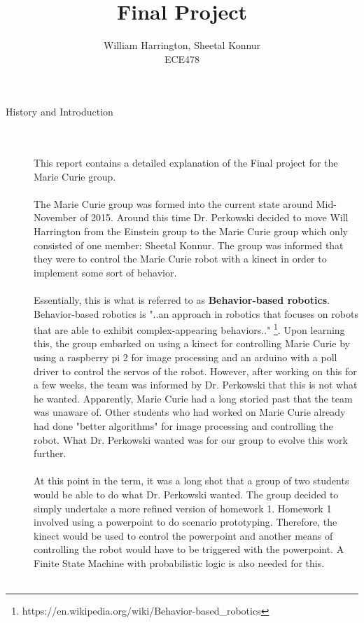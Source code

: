 \documentclass[12pt]{article}
\begin{document}
\title{Final Project}%
\author{William Harrington, Sheetal Konnur\\ %
ECE478} %
\date{}
 
\maketitle
\small
\begin{description}
	\item[History and Introduction] \hfill \\ \\
		This report contains a detailed explanation of the Final project for the Marie Curie group. \\ \\
		The Marie Curie group was formed into the current state around Mid-November of 2015. Around this time Dr. Perkowski decided to move Will Harrington from the Einstein group to the Marie Curie group which only consisted of one member: Sheetal Konnur. The group was informed that they were to control the Marie Curie robot with a kinect in order to implement some sort of behavior.\\ \\
		Essentially, this is what is referred to as \textbf{Behavior-based robotics}. Behavior-based robotics is "..an approach in robotics that focuses on robots that are able to exhibit complex-appearing behaviors.." \footnote{https://en.wikipedia.org/wiki/Behavior-based\_robotics}. Upon learning this, the group embarked on using a kinect for controlling Marie Curie by using a raspberry pi 2 for image processing and an arduino with a poll driver to control the servos of the robot. However, after working on this for a few weeks, the team was informed by Dr. Perkowski that this is not what he wanted. Apparently, Marie Curie had a long storied past that the team was unaware of. Other students who had worked on Marie Curie already had done "better algorithms" for image processing and controlling the robot. What Dr. Perkowski wanted was for our group to evolve this work further. \\ \\
		At this point in the term, it was a long shot that a group of two students would be able to do what Dr. Perkowski wanted. The group decided to simply undertake a more refined version of homework 1. Homework 1 involved using a powerpoint to do scenario prototyping. Therefore, the kinect would be used to control the powerpoint and another means of controlling the robot would have to be triggered with the powerpoint. A Finite State Machine with probabilistic logic is also needed for this. \\ \\

\end{description}
\end{document}
